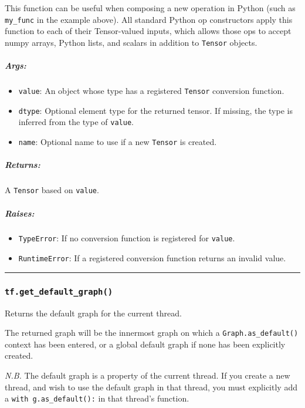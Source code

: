 This function can be useful when composing a new operation in Python
(such as \lstinline{my_func} in the example above). All standard Python op
constructors apply this function to each of their Tensor-valued inputs,
which allows those ops to accept numpy arrays, Python lists, and scalars
in addition to \lstinline{Tensor} objects.

\subparagraph{Args: }\label{args-24}

\begin{itemize}
\tightlist
\item
  \lstinline{value}: An object whose type has a registered \lstinline{Tensor}
  conversion function.
\item
  \lstinline{dtype}: Optional element type for the returned tensor. If
  missing, the type is inferred from the type of \lstinline{value}.
\item
  \lstinline{name}: Optional name to use if a new \lstinline{Tensor} is
  created.
\end{itemize}

\subparagraph{Returns: }\label{returns-27}

A \lstinline{Tensor} based on \lstinline{value}.

\subparagraph{Raises: }\label{raises-14}

\begin{itemize}
\tightlist
\item
  \lstinline{TypeError}: If no conversion function is registered for
  \lstinline{value}.
\item
  \lstinline{RuntimeError}: If a registered conversion function returns an
  invalid value.
\end{itemize}

\begin{center}\rule{0.5\linewidth}{\linethickness}\end{center}

\subsubsection{\texorpdfstring{\lstinline{tf.get_default_graph()}
}{tf.get_default_graph() }}\label{tf.getux5fdefaultux5fgraph}

Returns the default graph for the current thread.

The returned graph will be the innermost graph on which a
\lstinline{Graph.as_default()} context has been entered, or a global
default graph if none has been explicitly created.

\emph{N.B.} The default graph is a property of the current thread. If
you create a new thread, and wish to use the default graph in that
thread, you must explicitly add a \lstinline{with g.as_default():} in
that thread's function.

